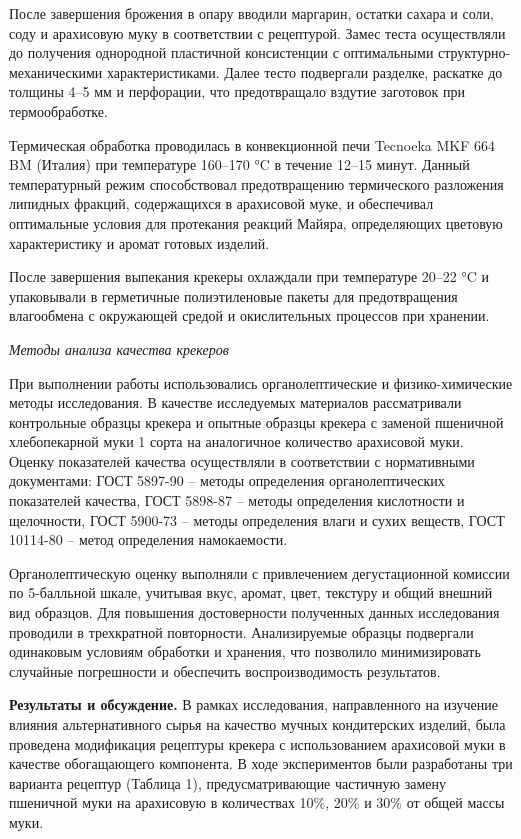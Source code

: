 {{{После завершения брожения в опару вводили маргарин, остатки сахара и
соли, соду и арахисовую муку в соответствии с рецептурой. Замес теста
осуществляли до получения однородной пластичной консистенции с
оптимальными структурно-механическими характеристиками. Далее тесто
подвергали разделке, раскатке до толщины 4--5 мм и перфорации, что
предотвращало вздутие заготовок при термообработке.

Термическая обработка проводилась в конвекционной печи Tecnoeka MKF 664
BM (Италия) при температуре 160--170 °C в течение 12--15 минут. Данный
температурный режим способствовал предотвращению термического разложения
липидных фракций, содержащихся в арахисовой муке, и обеспечивал
оптимальные условия для протекания реакций Майяра, определяющих цветовую
характеристику и аромат готовых изделий.

После завершения выпекания крекеры охлаждали при температуре 20--22 °C и
упаковывали в герметичные полиэтиленовые пакеты для предотвращения
влагообмена с окружающей средой и окислительных процессов при хранении.

\emph{Методы анализа качества крекеров}

При выполнении работы использовались органолептические и
физико-химические методы исследования. В качестве исследуемых материалов
рассматривали контрольные образцы крекера и опытные образцы крекера с
заменой пшеничной хлебопекарной муки 1 сорта на аналогичное количество
арахисовой муки. Оценку показателей качества осуществляли в соответствии
с нормативными документами: ГОСТ 5897-90 -- методы определения
органолептических показателей качества, ГОСТ 5898-87 -- методы
определения кислотности и щелочности, ГОСТ 5900-73 -- методы определения
влаги и сухих веществ, ГОСТ 10114-80 -- метод определения намокаемости.

Органолептическую оценку выполняли с привлечением дегустационной
комиссии по 5-балльной шкале, учитывая вкус, аромат, цвет, текстуру и
общий внешний вид образцов. Для повышения достоверности полученных
данных исследования проводили в трехкратной повторности. Анализируемые
образцы подвергали одинаковым условиям обработки и хранения, что
позволило минимизировать случайные погрешности и обеспечить
воспроизводимость результатов.

{\bfseries Результаты и обсуждение.} В рамках исследования, направленного
на изучение влияния альтернативного сырья на качество мучных
кондитерских изделий, была проведена модификация рецептуры крекера с
использованием арахисовой муки в качестве обогащающего компонента. В
ходе экспериментов были разработаны три варианта рецептур (Таблица 1),
предусматривающие частичную замену пшеничной муки на арахисовую в
количествах 10\%, 20\% и 30\% от общей массы муки.

}}}

